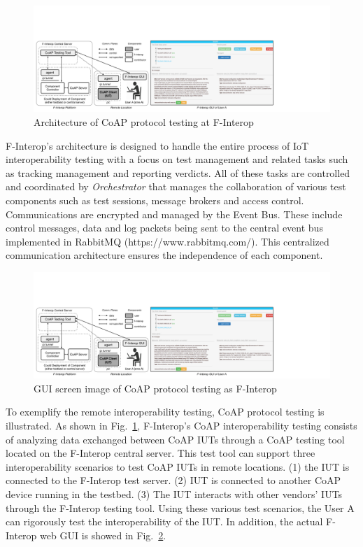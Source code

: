 \begin{figure}[H]			%
	\centering
	\includegraphics[width=\textwidth]{figures/fig_f-interop-diagram.pdf}
    \caption{Architecture of CoAP protocol testing at F-Interop}
    \label{fig:fi_interop_coap_testing}
\end{figure}

F-Interop's architecture is designed to handle the entire process of IoT interoperability testing with a focus on test management and related tasks such as tracking management and reporting verdicts. All of these tasks are controlled and coordinated by \textit{Orchestrator} that manages the collaboration of various test components such as test sessions, message brokers and access control. Communications are encrypted and managed by the Event Bus. These include control messages, data and log packets being sent to the central event bus implemented in RabbitMQ (https://www.rabbitmq.com/). This centralized communication architecture ensures the independence of each component.

\begin{figure}[H]			%
	\centering
	\includegraphics[width=\textwidth]{figures/fig_f-interop-diagram_web.pdf}
    \caption{GUI screen image of CoAP protocol testing as F-Interop}
    \label{fig:f_interop_coap_gui_screen}
\end{figure}

To exemplify the remote interoperability testing, CoAP protocol testing is illustrated. As shown in Fig.~\ref{fig:fi_interop_coap_testing}, F-Interop's CoAP interoperability testing consists of analyzing data exchanged between CoAP IUTs through a CoAP testing tool located on the F-Interop central server. This test tool can support three interoperability scenarios to test CoAP IUTs in remote locations. (1) the IUT is connected to the F-Interop test server. (2) IUT is connected to another CoAP device running in the testbed. (3) The IUT interacts with other vendors' IUTs through the F-Interop testing tool. Using these various test scenarios, the User A can rigorously test the interoperability of the IUT. In addition, the actual F-Interop web GUI is showed in Fig.~\ref{fig:f_interop_coap_gui_screen}.

